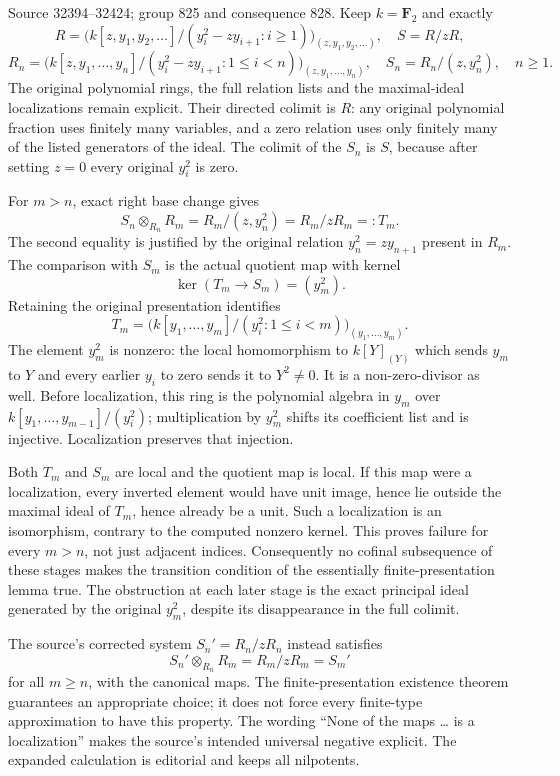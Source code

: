 Source 32394--32424; group 825 and consequence 828. Keep \(k=\mathbf F_2\) and exactly \[
R=\bigl(k[z,y_1,y_2,\ldots]/(y_i^2-z y_{i+1}:i\ge1)\bigr)_{(z,y_1,y_2,\ldots)},
\quad S=R/zR,
\] \[
R_n=\bigl(k[z,y_1,\ldots,y_n]/(y_i^2-z y_{i+1}:1\le i<n)\bigr)_{(z,y_1,\ldots,y_n)},
\quad S_n=R_n/(z,y_n^2),\quad n\ge1.
\] The original polynomial rings, the full relation lists and the maximal-ideal localizations remain explicit. Their directed colimit is \(R\): any original polynomial fraction uses finitely many variables, and a zero relation uses only finitely many of the listed generators of the ideal. The colimit of the \(S_n\) is \(S\), because after setting \(z=0\) every original \(y_i^2\) is zero.

For \(m>n\), exact right base change gives \[
S_n\otimes_{R_n}R_m=R_m/(z,y_n^2)=R_m/zR_m=:T_m.
\] The second equality is justified by the original relation \(y_n^2=z y_{n+1}\) present in \(R_m\). The comparison with \(S_m\) is the actual quotient map with kernel \[
\ker(T_m\to S_m)=(y_m^2).
\] Retaining the original presentation identifies \[
T_m=
\bigl(k[y_1,\ldots,y_m]/(y_i^2:1\le i<m)\bigr)_{(y_1,\ldots,y_m)}.
\] The element \(y_m^2\) is nonzero: the local homomorphism to \(k[Y]_{(Y)}\) which sends \(y_m\) to \(Y\) and every earlier \(y_i\) to zero sends it to \(Y^2\ne0\). It is a non-zero-divisor as well. Before localization, this ring is the polynomial algebra in \(y_m\) over \(k[y_1,\ldots,y_{m-1}]/(y_i^2)\); multiplication by \(y_m^2\) shifts its coefficient list and is injective. Localization preserves that injection.

Both \(T_m\) and \(S_m\) are local and the quotient map is local. If this map were a localization, every inverted element would have unit image, hence lie outside the maximal ideal of \(T_m\), hence already be a unit. Such a localization is an isomorphism, contrary to the computed nonzero kernel. This proves failure for every \(m>n\), not just adjacent indices. Consequently no cofinal subsequence of these stages makes the transition condition of the essentially finite-presentation lemma true. The obstruction at each later stage is the exact principal ideal generated by the original \(y_m^2\), despite its disappearance in the full colimit.

The source's corrected system \(S_n'=R_n/zR_n\) instead satisfies \[
S_n'\otimes_{R_n}R_m=R_m/zR_m=S_m'
\] for all \(m\ge n\), with the canonical maps. The finite-presentation existence theorem guarantees an appropriate choice; it does not force every finite-type approximation to have this property. The wording ``None of the maps \ldots{} is a localization'' makes the source's intended universal negative explicit. The expanded calculation is editorial and keeps all nilpotents.

